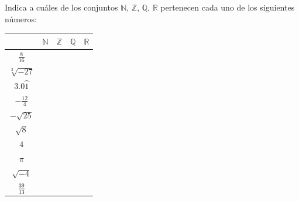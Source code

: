 \documentclass[addpoints,spanish, 12pt,a4paper]{exam}
\begin{document}
\begin{questions}


\question[2] Indica a cuáles de los conjuntos
$\mathbb{N}$, $\mathbb{Z}$, $\mathbb{Q}$, $\mathbb{R}$ pertenecen cada uno de los siguientes números:
\begin{center}
\begin{tabular}{|c |c |c |c |c|}\hline
&$\mathbb{N}$& $\mathbb{Z}$& $\mathbb{Q}$&$\mathbb{R}$\\ 
\hline
$\frac{8}{16}$&&&&\\
\hline
$\sqrt[3]{-27}$&&&&\\
\hline
$3.0\wideparen{1}$&&&&\\
\hline
$-\frac{12}{4}$&&&&\\
\hline
$-\sqrt{25}$&&&&\\
\hline
$\sqrt{8}$&&&&\\
\hline
$4$&&&&\\
\hline
$\pi$&&&&\\
\hline
$\sqrt{-4}$&&&&\\
\hline
$\frac{39}{13}$&&&&\\
\hline
\end{tabular}

\end{center}

\addpoints



\end{questions}
\end{document}

